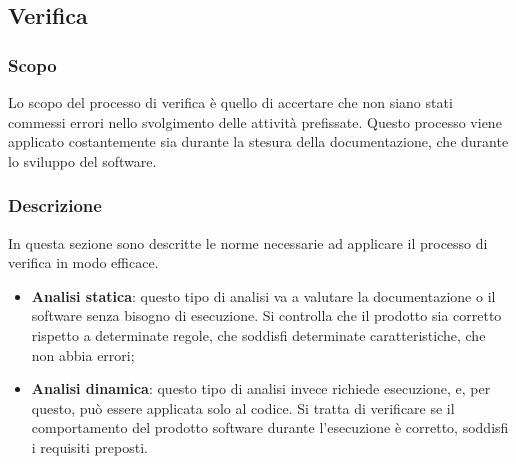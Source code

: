 \subsection{Verifica}
\subsubsection{Scopo}
Lo scopo del processo di verifica è quello di accertare che non siano stati commessi 
errori nello svolgimento delle attività prefissate. Questo processo viene applicato 
costantemente sia durante la stesura della documentazione, che durante lo sviluppo 
del software. 

\subsubsection{Descrizione}
In questa sezione sono descritte le norme necessarie ad applicare il processo di 
verifica in modo efficace.
\begin{itemize}
    \item \textbf{Analisi statica}: questo tipo di analisi va a valutare la 
    documentazione o il software senza bisogno di esecuzione. Si controlla che il 
    prodotto sia corretto rispetto a determinate regole, che soddisfi determinate 
    caratteristiche, che non abbia errori;
    \item \textbf{Analisi dinamica}: questo tipo di analisi invece richiede esecuzione, e, per 
    questo, può essere applicata solo al codice. Si tratta di verificare se il comportamento del 
    prodotto software durante l’esecuzione è corretto, soddisfi i requisiti preposti.
\end{itemize} 

